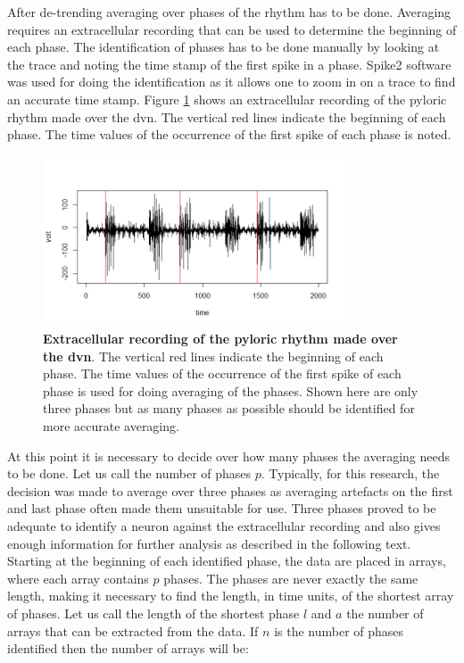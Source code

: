 After de-trending averaging over phases of the rhythm has to be done. Averaging requires an extracellular recording that can be used to determine the beginning of each phase. The identification of phases has to be done manually by looking at the trace and noting the time stamp of the first spike in a phase. Spike2 software was used for doing the identification as it allows one to zoom in on a trace to find an accurate time stamp. Figure \ref{fig:data_phases} shows an extracellular recording of the pyloric rhythm made over the \ac{dvn}. The vertical red lines indicate the beginning of each phase. The time values of the occurrence of the first spike of each phase is noted.

\begin{figure}[H]
	\begin{center}
		\includegraphics[width=0.8\textwidth]{graphics/data_phases.png}
		\caption[Extracellular recording of the pyloric rhythm.]{\textbf{Extracellular recording of the pyloric rhythm made over the \ac{dvn}}. The vertical red lines indicate the beginning of each phase. The time values of the occurrence of the first spike of each phase is used for doing averaging of the phases. Shown here are only three phases but as many phases as possible should be identified for more accurate averaging.}
		\label{fig:data_phases}
	\end{center}
\end{figure}

At this point it is necessary to decide over how many phases the averaging needs to be done. Let us call the number of phases $p$. Typically, for this research, the decision was made to average over three phases as averaging artefacts on the first and last phase often made them unsuitable for use. Three phases proved to be adequate to identify a neuron against the extracellular recording and also gives enough information for further analysis as described in the following text. Starting at the beginning of each identified phase, the data are placed in arrays, where each array contains $p$ phases. The phases are never exactly the same length, making it necessary to find the length, in time units, of the shortest array of phases. Let us call the length of the shortest phase $l$ and $a$ the number of arrays that can be extracted from the data. If $n$ is the number of phases identified then the number of arrays will be:


